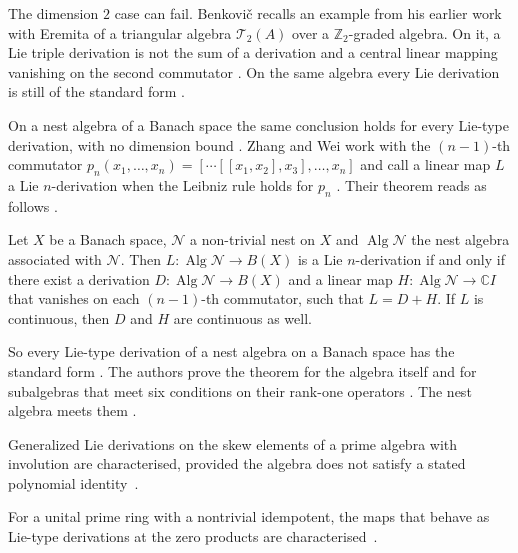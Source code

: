 The dimension $2$ case can fail.
Benkovič recalls an example from his earlier
work with Eremita of a triangular algebra $\mathcal{T}_{2}(A)$ over a
$\mathbb{Z}_{2}$-graded algebra.
On it, a Lie triple derivation is not the
sum of a derivation and a central linear mapping vanishing on the second
commutator \cite[p.~163]{Benkovic2015}. On the same algebra every Lie
derivation is still of the standard form \cite[p.~164]{Benkovic2015}.

On a nest algebra of a Banach space the same conclusion holds for every
Lie-type derivation, with no dimension bound
\cite[Theorem~3.1, p.~6]{ZhangWei2017Nest}. Zhang and Wei work with the
$(n-1)$-th commutator $p_n(x_1,\dots,x_n)=[\cdots[[x_1,x_2],x_3],\dots,x_n]$ and
call a linear map $L$ a Lie $n$-derivation when the Leibniz rule holds for
$p_n$ \cite[p.~2]{ZhangWei2017Nest}. Their theorem reads as follows
\cite[Theorem~3.1, p.~6]{ZhangWei2017Nest}.

\begin{theorem}\label{thm:lie:zhang-wei-nest}
Let $X$ be a Banach space, $\mathcal{N}$ a non-trivial nest on $X$ and
$\operatorname{Alg}\mathcal{N}$ the nest algebra associated with $\mathcal{N}$.
Then $L\colon\operatorname{Alg}\mathcal{N}\to B(X)$ is a Lie $n$-derivation if
and only if there exist a derivation $D\colon\operatorname{Alg}\mathcal{N}\to B(X)$
and a linear map $H\colon\operatorname{Alg}\mathcal{N}\to\mathbb{C}I$ that
vanishes on each $(n-1)$-th commutator, such that $L=D+H$. If $L$ is continuous,
then $D$ and $H$ are continuous as well.
\end{theorem}

So every Lie-type derivation of a nest algebra on a Banach space has the
standard form \cite[p.~3]{ZhangWei2017Nest}. The authors prove the theorem for
the algebra itself and for subalgebras that meet six conditions on their
rank-one operators \cite[pp.~6--7]{ZhangWei2017Nest}. The nest algebra meets
them \cite[p.~7]{ZhangWei2017Nest}.

Generalized Lie derivations on the skew elements of a prime algebra with involution are characterised, provided the algebra does not satisfy a stated polynomial identity~\cite{WlGeneralizedLieDerivationsOnSke2011}.

For a unital prime ring with a nontrivial idempotent, the maps that behave as Lie-type derivations at the zero products are characterised~\cite{WlOnLieTypeDerivationsOfRingsAnd2019}.
